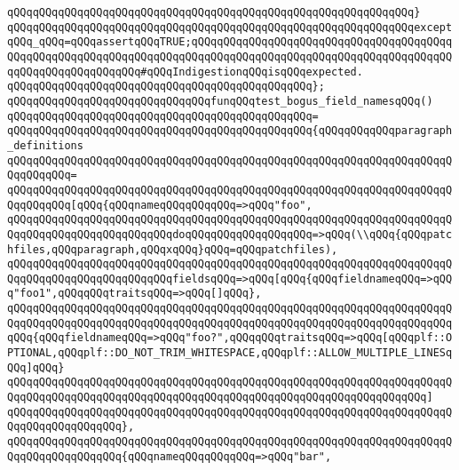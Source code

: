 \verb|qQQqqQQqqQQqqQQqqQQqqQQqqQQqqQQqqQQqqQQqqQQqqQQqqQQqqQQqqQQqqQQq}|\newline
\verb|qQQqqQQqqQQqqQQqqQQqqQQqqQQqqQQqqQQqqQQqqQQqqQQqqQQqqQQqqQQqqQQqexceptqQQq_qQQq=qQQqassertqQQqTRUE;qQQqqQQqqQQqqQQqqQQqqQQqqQQqqQQqqQQqqQQqqQQqqQQqqQQqqQQqqQQqqQQqqQQqqQQqqQQqqQQqqQQqqQQqqQQqqQQqqQQqqQQqqQQqqQQqqQQqqQQqqQQqqQQqqQQq#qQQqIndigestionqQQqisqQQqexpected.|\newline
\verb|qQQqqQQqqQQqqQQqqQQqqQQqqQQqqQQqqQQqqQQqqQQqqQQq};|\newline
\newline
\verb|qQQqqQQqqQQqqQQqqQQqqQQqqQQqqQQqfunqQQqtest_bogus_field_namesqQQq()|\newline
\verb|qQQqqQQqqQQqqQQqqQQqqQQqqQQqqQQqqQQqqQQqqQQqqQQq=|\newline
\verb|qQQqqQQqqQQqqQQqqQQqqQQqqQQqqQQqqQQqqQQqqQQqqQQq{qQQqqQQqqQQqparagraph_definitions|\newline
\verb|qQQqqQQqqQQqqQQqqQQqqQQqqQQqqQQqqQQqqQQqqQQqqQQqqQQqqQQqqQQqqQQqqQQqqQQqqQQqqQQq=|\newline
\verb|qQQqqQQqqQQqqQQqqQQqqQQqqQQqqQQqqQQqqQQqqQQqqQQqqQQqqQQqqQQqqQQqqQQqqQQqqQQqqQQq[qQQq{qQQqnameqQQqqQQqqQQq=>qQQq"foo",|\newline
\verb|qQQqqQQqqQQqqQQqqQQqqQQqqQQqqQQqqQQqqQQqqQQqqQQqqQQqqQQqqQQqqQQqqQQqqQQqqQQqqQQqqQQqqQQqqQQqqQQqdoqQQqqQQqqQQqqQQqqQQq=>qQQq(\\qQQq{qQQqpatchfiles,qQQqparagraph,qQQqxqQQq}qQQq=qQQqpatchfiles),|\newline
\verb|qQQqqQQqqQQqqQQqqQQqqQQqqQQqqQQqqQQqqQQqqQQqqQQqqQQqqQQqqQQqqQQqqQQqqQQqqQQqqQQqqQQqqQQqqQQqqQQqfieldsqQQq=>qQQq[qQQq{qQQqfieldnameqQQq=>qQQq"foo1",qQQqqQQqtraitsqQQq=>qQQq[]qQQq},|\newline
\verb|qQQqqQQqqQQqqQQqqQQqqQQqqQQqqQQqqQQqqQQqqQQqqQQqqQQqqQQqqQQqqQQqqQQqqQQqqQQqqQQqqQQqqQQqqQQqqQQqqQQqqQQqqQQqqQQqqQQqqQQqqQQqqQQqqQQqqQQqqQQqqQQq{qQQqfieldnameqQQq=>qQQq"foo?",qQQqqQQqtraitsqQQq=>qQQq[qQQqplf::OPTIONAL,qQQqplf::DO_NOT_TRIM_WHITESPACE,qQQqplf::ALLOW_MULTIPLE_LINESqQQq]qQQq}|\newline
\verb|qQQqqQQqqQQqqQQqqQQqqQQqqQQqqQQqqQQqqQQqqQQqqQQqqQQqqQQqqQQqqQQqqQQqqQQqqQQqqQQqqQQqqQQqqQQqqQQqqQQqqQQqqQQqqQQqqQQqqQQqqQQqqQQqqQQqqQQq]|\newline
\verb|qQQqqQQqqQQqqQQqqQQqqQQqqQQqqQQqqQQqqQQqqQQqqQQqqQQqqQQqqQQqqQQqqQQqqQQqqQQqqQQqqQQqqQQq},|\newline
\newline
\verb|qQQqqQQqqQQqqQQqqQQqqQQqqQQqqQQqqQQqqQQqqQQqqQQqqQQqqQQqqQQqqQQqqQQqqQQqqQQqqQQqqQQqqQQq{qQQqnameqQQqqQQqqQQq=>qQQq"bar",|\newline
